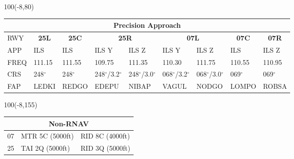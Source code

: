 \documentclass[10pt,landscape,a4paper]{article}
\begin{document}
\begin{textblock}{100}(-8,80)
\begin{table}[]
\begin{tabular}{|l|l|l|l|l|l|l|l|l|}
\multicolumn{9}{c}{\textbf{Precision Approach}}                                                                                                                                                                            \\ \hline
RWY  & \multicolumn{1}{c|}{\textbf{25L}} & \multicolumn{1}{c|}{\textbf{25C}} & \multicolumn{2}{c|}{\textbf{25R}} & \multicolumn{2}{c|}{\textbf{07L}} & \multicolumn{1}{c|}{\textbf{07C}} & \multicolumn{1}{c|}{\textbf{07R}} \\ \hline
APP  & ILS                               & ILS                               & ILS Y           & ILS Z           & ILS Y           & ILS Z           & ILS                               & ILS Z                             \\
FREQ & 111.15                            & 111.55                            & 109.75          & 111.35          & 110.30          & 111.75          & 110.55                            & 110.95                            \\
CRS  & 248$^\circ$                              & 248$^\circ$                              & 248$^\circ$/3.2$^\circ$       & 248$^\circ$/3.0$^\circ$       & 068$^\circ$/3.2$^\circ$       & 068$^\circ$/3.0$^\circ$       & 069$^\circ$                              & 069$^\circ$                              \\
FAP  & LEDKI                             & REDGO                             & EDEPU           & NIBAP           & VAGUL           & NODGO           & LOMPO                             & ROBSA                             \\ \hline
\end{tabular}
\end{table}
\end{textblock}



\begin{textblock}{100}(-8,155)
\begin{table}[]
\begin{tabular}{|l|l|l|}
\multicolumn{3}{c}{\textbf{Non-RNAV}} \\ \hline
07  & MTR 5C (5000ft)    & RID 8C (4000ft)   \\ \hline
25  & TAI 2Q (5000ft)    & RID 3Q (5000ft)   \\ \hline
\end{tabular}
\end{table}
\end{textblock}
\end{document}
